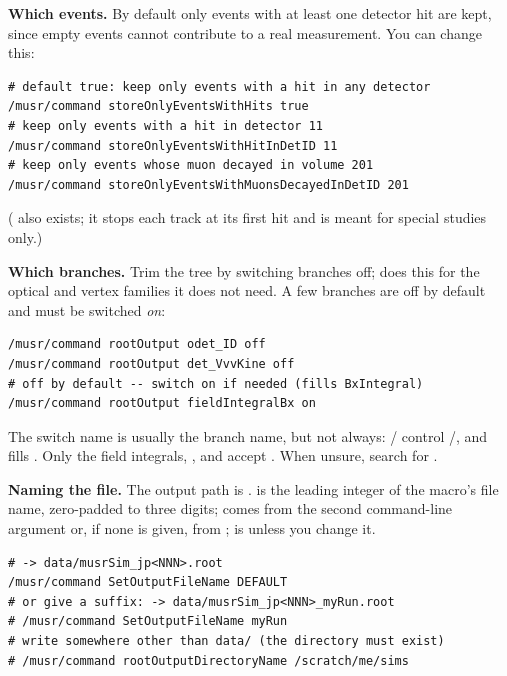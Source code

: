 \textbf{Which events.} By default only events with at least one detector hit are kept, since empty events cannot contribute to a real measurement. You can change this:

\begin{lstlisting}[style=mac,caption={Event-selection switches (pick what you need)}]
# default true: keep only events with a hit in any detector
/musr/command storeOnlyEventsWithHits true
# keep only events with a hit in detector 11
/musr/command storeOnlyEventsWithHitInDetID 11
# keep only events whose muon decayed in volume 201
/musr/command storeOnlyEventsWithMuonsDecayedInDetID 201
\end{lstlisting}

( also exists; it stops each track at its first hit and is meant for special studies only.)

\textbf{Which branches.} Trim the tree by switching branches off;  does this for the optical and vertex families it does not need. A few branches are off by default and must be switched \emph{on}:

\begin{lstlisting}[style=mac,caption={Pruning unused branches keeps files small and fast}]
/musr/command rootOutput odet_ID off
/musr/command rootOutput det_VvvKine off
# off by default -- switch on if needed (fills BxIntegral)
/musr/command rootOutput fieldIntegralBx on
\end{lstlisting}

\begin{checkbuild}
The switch name is usually the branch name, but not always: / control /, and  fills . Only the field integrals, ,  and  accept . When unsure, search  for .
\end{checkbuild}

\textbf{Naming the file.} The output path is .  is the leading integer of the macro's file name, zero-padded to three digits;  comes from the second command-line argument or, if none is given, from ;  is  unless you change it.

\begin{lstlisting}[style=mac,caption={Naming the ROOT file from inside the macro}]
# -> data/musrSim_jp<NNN>.root
/musr/command SetOutputFileName DEFAULT
# or give a suffix: -> data/musrSim_jp<NNN>_myRun.root
# /musr/command SetOutputFileName myRun
# write somewhere other than data/ (the directory must exist)
# /musr/command rootOutputDirectoryName /scratch/me/sims
\end{lstlisting}

